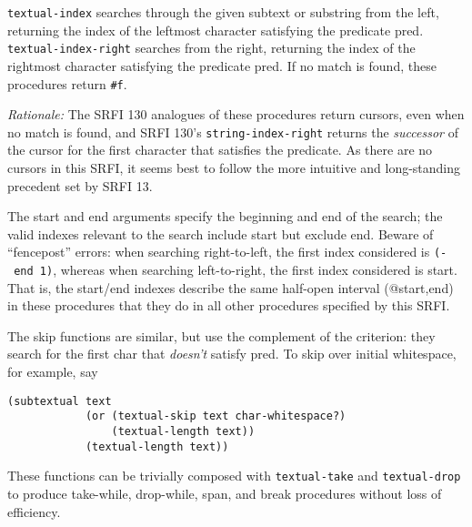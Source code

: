 \begin{entry}{%
  }

  \texttt{textual-index} searches through
  the given subtext or substring from the left, returning the index of
  the leftmost character satisfying the predicate
  pred. \texttt{textual-index-right} searches from the right,
  returning the index of the rightmost character satisfying the
  predicate pred. If no match is found, these procedures return
  \texttt{\#f}.

  \emph{Rationale:} The SRFI 130 analogues of these procedures return
  cursors, even when no match is found, and SRFI 130's
  \texttt{string-index-right} returns the \emph{successor} of the
  cursor for the first character that satisfies the predicate. As
  there are no cursors in this SRFI, it seems best to follow the more
  intuitive and long-standing precedent set by SRFI 13.

  The start and end arguments specify the beginning and end of the
  search; the valid indexes relevant to the search include start but
  exclude end.  Beware of ``fencepost'' errors: when searching
  right-to-left, the first index considered is \texttt{(-\ end\ 1)},
  whereas when searching left-to-right, the first index considered is
  start. That is, the start/end indexes describe the same half-open
  interval (@start,end) in these procedures that they do in all other
  procedures specified by this SRFI.

  The skip functions are similar, but use the complement of the
  criterion: they search for the first char that \emph{doesn't}
  satisfy pred. To skip over initial whitespace, for example, say

\begin{verbatim}
(subtextual text
            (or (textual-skip text char-whitespace?)
                (textual-length text))
            (textual-length text))
\end{verbatim}

  These functions can be trivially composed with \texttt{textual-take}
  and \texttt{textual-drop} to produce take-while, drop-while, span,
  and break procedures without loss of efficiency.
\end{entry}

